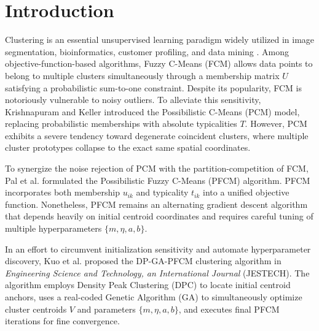 \documentclass[preprint,12pt]{elsarticle}
\begin{document}
\section{Introduction}
\label{sec:intro}
Clustering is an essential unsupervised learning paradigm widely utilized in image segmentation, bioinformatics, customer profiling, and data mining \cite{bezdek1981pattern}. Among objective-function-based algorithms, Fuzzy C-Means (FCM) allows data points to belong to multiple clusters simultaneously through a membership matrix $U$ satisfying a probabilistic sum-to-one constraint. Despite its popularity, FCM is notoriously vulnerable to noisy outliers. To alleviate this sensitivity, Krishnapuram and Keller \cite{krishnapuram1993possibilistic} introduced the Possibilistic C-Means (PCM) model, replacing probabilistic memberships with absolute typicalities $T$. However, PCM exhibits a severe tendency toward degenerate coincident clusters, where multiple cluster prototypes collapse to the exact same spatial coordinates.

To synergize the noise rejection of PCM with the partition-competition of FCM, Pal et al. \cite{pal2005possibilistic} formulated the Possibilistic Fuzzy C-Means (PFCM) algorithm. PFCM incorporates both membership $u_{ik}$ and typicality $t_{ik}$ into a unified objective function. Nonetheless, PFCM remains an alternating gradient descent algorithm that depends heavily on initial centroid coordinates and requires careful tuning of multiple hyperparameters $\{m, \eta, a, b\}$.

In an effort to circumvent initialization sensitivity and automate hyperparameter discovery, Kuo et al. \cite{kuo2023density} proposed the DP-GA-PFCM clustering algorithm in \textit{Engineering Science and Technology, an International Journal} (JESTECH). The algorithm employs Density Peak Clustering (DPC) \cite{rodriguez2014clustering} to locate initial centroid anchors, uses a real-coded Genetic Algorithm (GA) to simultaneously optimize cluster centroids $V$ and parameters $\{m, \eta, a, b\}$, and executes final PFCM iterations for fine convergence.
\end{document}
